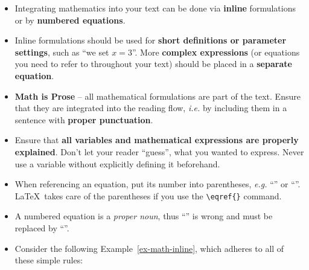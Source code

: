 \documentclass[11pt,a4paper]{article}
\begin{document}
\begin{itemize}

\item Integrating mathematics into your text can be done via \textbf{inline} formulations or by \textbf{numbered equations}.

\item  Inline formulations should be used for \textbf{short definitions or parameter settings}, such as ``we set $x = 3$''.  More \textbf{complex expressions} (or equations you need to refer to throughout your text) should be placed in a \textbf{separate equation}.
  
\item \textbf{Math is Prose} -- all mathematical formulations are part of the text. Ensure that they are integrated into the reading flow, \emph{i.e.} by including them in a sentence with \textbf{proper punctuation}.


  
\item Ensure that \textbf{all variables and mathematical expressions are properly explained}. Don't let your reader ``guess'', what you wanted to express. Never use a variable without explicitly defining it beforehand.
  
\item When referencing an equation, put its number into parentheses, \emph{e.g.} ``'' or ``''.  \LaTeX~takes care of the parentheses if you use the \verb,\eqref{}, command.  

\item A numbered equation is a \emph{proper noun}, thus ``'' is wrong and must be replaced by ``''.

\item Consider the following Example~\ref{ex-math-inline}, which adheres to all of these simple rules:

\end{itemize}
% 
\vspace{-0.5em}
\begin{texexample}
  \label{ex-math-inline}
  
  
\end{texexample}
\end{document}
